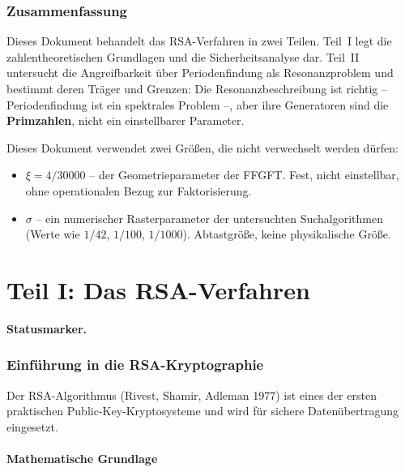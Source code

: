 
\section*{Zusammenfassung}

Dieses Dokument behandelt das RSA-Verfahren in zwei Teilen. Teil~I legt
die zahlentheoretischen Grundlagen und die Sicherheitsanalyse dar.
Teil~II untersucht die Angreifbarkeit über Periodenfindung als
Resonanzproblem und bestimmt deren Träger und Grenzen: Die
Resonanzbeschreibung ist richtig -- Periodenfindung ist ein spektrales
Problem --, aber ihre Generatoren sind die \textbf{Primzahlen}, nicht
ein einstellbarer Parameter.

\begin{keyresult}
Dieses Dokument verwendet zwei Größen, die nicht verwechselt werden
dürfen:
\begin{itemize}
  \item $\xi = 4/30000$ -- der Geometrieparameter der FFGFT. Fest,
    nicht einstellbar, ohne operationalen Bezug zur Faktorisierung.
  \item $\sigma$ -- ein numerischer Rasterparameter der untersuchten
    Suchalgorithmen (Werte wie $1/42$, $1/100$, $1/1000$). Abtastgröße,
    keine physikalische Größe.
\end{itemize}
\end{keyresult}

\part*{Teil I: Das RSA-Verfahren}

\medskip\noindent\textbf{Statusmarker.}


\section{Einführung in die RSA-Kryptographie}

Der RSA-Algorithmus (Rivest, Shamir, Adleman 1977) ist eines der ersten
praktischen Public-Key-Kryptosysteme und wird für sichere
Datenübertragung eingesetzt.

\subsection{Mathematische Grundlage}

